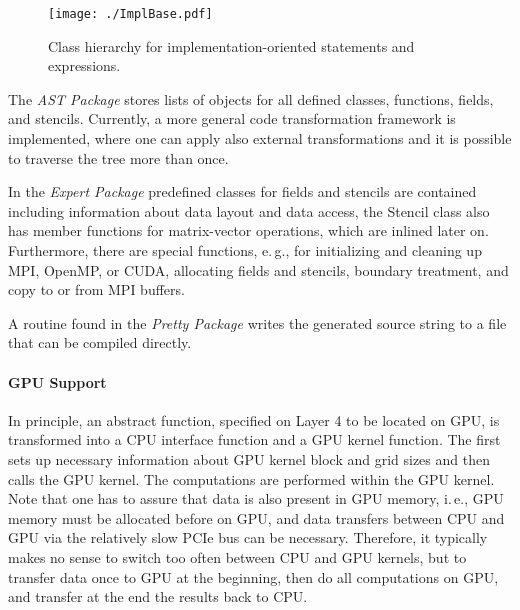 \documentclass[onecolumn]{svjour3}
\begin{document}
\begin{figure}[ht!]
\begin{center}
\texttt{[image: ./ImplBase.pdf]}
\caption[Partitioning of a cell-centered grid into four sub-grids]{Class hierarchy for implementation-oriented statements and expressions.}
\label{fig:scalaimpl}
\end{center}
\end{figure}

The \textit{AST Package} stores lists of objects for all defined classes, functions, fields, and stencils.
Currently, a more general code transformation framework is implemented, where one can apply also external transformations and it is possible to traverse the tree more than once. 

In the \textit{Expert Package} predefined classes for fields and stencils are contained including information about data layout and data access, the Stencil class also has member functions for matrix-vector operations, which are inlined later on. Furthermore, there are special functions, e.\,g., for initializing and cleaning up MPI, OpenMP, or CUDA, allocating fields and stencils, boundary treatment, and copy to or from MPI buffers.




A routine found in the \textit{Pretty Package} writes the generated source string to a file that can be compiled directly.

\paragraph{GPU Support}

In principle, an abstract function, specified on Layer 4 to be located on GPU, is transformed into a CPU interface function and a GPU kernel function. The first sets up necessary information about GPU kernel block and grid sizes and then calls the GPU kernel. The computations are performed within the GPU kernel. Note that one has to assure that data is also present in GPU memory, i.\,e., GPU memory must be allocated before on GPU, and data transfers between CPU and GPU via the relatively slow PCIe bus can be necessary. Therefore, it typically makes no sense to switch too often between CPU and GPU kernels, but to transfer data once to GPU at the beginning, then do all computations on GPU, and transfer at the end the results back to CPU.
\end{document}
